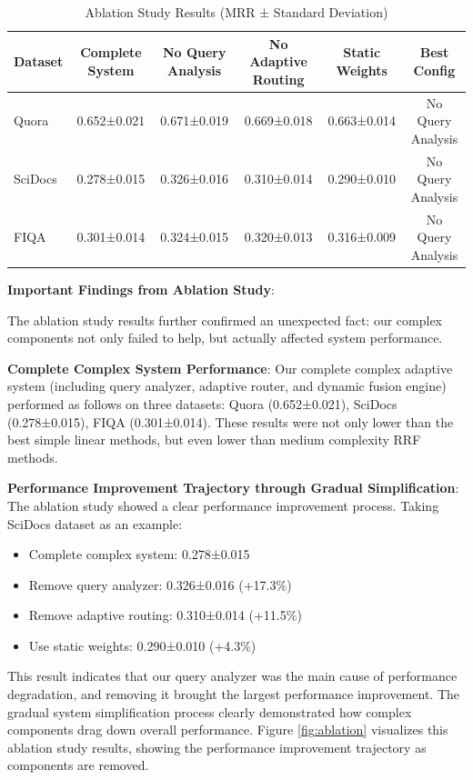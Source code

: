 \documentclass[letterpaper]{article} %
\begin{document}
\begin{table}[t]
\centering
\caption{Ablation Study Results (MRR ± Standard Deviation)}
\label{tab:ablation}
\begin{tabular}{lccccc}
\toprule
Dataset & Complete System & No Query Analysis & No Adaptive Routing & Static Weights & Best Config \\
\midrule
Quora & 0.652±0.021 & 0.671±0.019 & 0.669±0.018 & 0.663±0.014 & No Query Analysis \\
SciDocs & 0.278±0.015 & 0.326±0.016 & 0.310±0.014 & 0.290±0.010 & No Query Analysis \\
FIQA & 0.301±0.014 & 0.324±0.015 & 0.320±0.013 & 0.316±0.009 & No Query Analysis \\
\bottomrule
\end{tabular}
\end{table}

\textbf{Important Findings from Ablation Study}:

The ablation study results further confirmed an unexpected fact: our complex components not only failed to help, but actually affected system performance.

\textbf{Complete Complex System Performance}: Our complete complex adaptive system (including query analyzer, adaptive router, and dynamic fusion engine) performed as follows on three datasets: Quora (0.652±0.021), SciDocs (0.278±0.015), FIQA (0.301±0.014). These results were not only lower than the best simple linear methods, but even lower than medium complexity RRF methods.

\textbf{Performance Improvement Trajectory through Gradual Simplification}: The ablation study showed a clear performance improvement process. Taking SciDocs dataset as an example:
\begin{itemize}
\item Complete complex system: 0.278±0.015
\item Remove query analyzer: 0.326±0.016 (+17.3\%)
\item Remove adaptive routing: 0.310±0.014 (+11.5\%)
\item Use static weights: 0.290±0.010 (+4.3\%)
\end{itemize}

This result indicates that our query analyzer was the main cause of performance degradation, and removing it brought the largest performance improvement. The gradual system simplification process clearly demonstrated how complex components drag down overall performance. Figure \ref{fig:ablation} visualizes this ablation study results, showing the performance improvement trajectory as components are removed.
\end{document}
